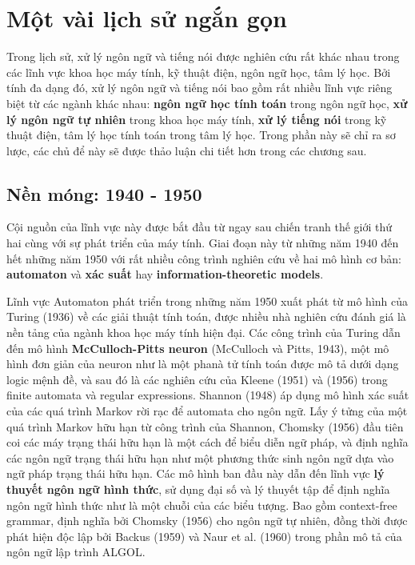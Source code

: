 \section{Một vài lịch sử ngắn gọn}

Trong lịch sử, xử lý ngôn ngữ và tiếng nói được nghiên cứu rất khác nhau trong các lĩnh vực khoa học máy tính, kỹ thuật điện, ngôn ngữ học, tâm lý học. Bởi tính đa dạng đó, xử lý ngôn ngữ và tiếng nói bao gồm rất nhiều lĩnh vực riêng biệt từ các ngành khác nhau: \textbf{ngôn ngữ học tính toán} trong ngôn ngữ học, \textbf{xử lý ngôn ngữ tự nhiên} trong khoa học máy tính, \textbf{xử lý tiếng nói} trong kỹ thuật điện, tâm lý học tính toán trong tâm lý học. Trong phần này sẽ chỉ ra sơ lược, các chủ để này sẽ được thảo luận chi tiết hơn trong các chương sau.

\subsection{Nền móng: 1940 - 1950}

Cội nguồn của lĩnh vực này được bắt đầu từ ngay sau chiến tranh thế giới thứ hai cùng với sự phát triển của máy tính. Giai đoạn này từ những năm 1940 đến hết những năm 1950 với rất nhiều công trình nghiên cứu về hai mô hình cơ bản: \textbf{automaton} và \textbf{xác suất} hay \textbf{information-theoretic models}.

Lĩnh vực Automaton phát triển trong những năm 1950 xuất phát từ mô hình của Turing (1936) về các giải thuật tính toán, được nhiều nhà nghiên cứu đánh giá là nền tảng của ngành khoa học máy tính hiện đại. Các công trình của Turing dẫn đến mô hình \textbf{McCulloch-Pitts neuron} (McCulloch và Pitts, 1943), một mô hình đơn giản của neuron như là một phanà tử tính toán được mô tả dưới dạng logic mệnh đề, và sau đó là các nghiên cứu của Kleene (1951) và (1956) trong finite automata và regular expressions. Shannon (1948) áp dụng mô hình xác suất của các quá trình Markov rời rạc để automata cho ngôn ngữ. Lấy ý tửng của một quá trình Markov hữu hạn từ công trình của Shannon, Chomsky (1956) đầu tiên coi các máy trạng thái hữu hạn là một cách để biểu diễn ngữ pháp, và định nghĩa các ngôn ngữ trạng thái hữu hạn như một phương thức sinh ngôn ngữ dựa vào ngữ pháp trạng thái hữu hạn. Các mô hình ban đầu này dẫn đến lĩnh vực \textbf{lý thuyết ngôn ngữ hình thức}, sử dụng đại số và lý thuyết tập để định nghĩa ngôn ngữ hình thức như là một chuỗi của các biểu tượng. Bao gồm context-free grammar, định nghĩa bởi Chomsky (1956) cho ngôn ngữ tự nhiên, đồng thời được phát hiện độc lập bởi Backus (1959) và Naur et al. (1960) trong phần mô tả của ngôn ngữ lập trình ALGOL.

